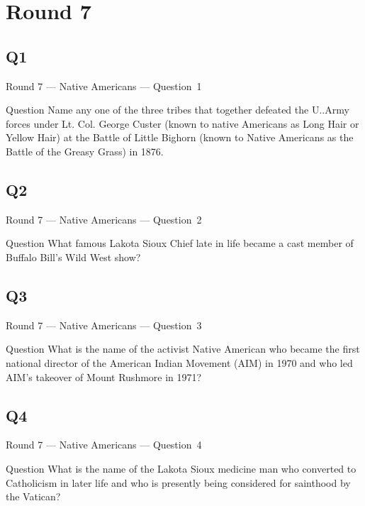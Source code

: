 \documentclass[11pt]{beamer}
\begin{document}
\section{Round 7}
\subsection*{Q1}
\begin{frame}[t]{Round 7 --- Native Americans --- \mbox{Question 1}}
    \vspace{-0.5em}
    \begin{block}{Question}
        Name any one of the three tribes that together defeated the U.\@S.\@ Army forces under Lt. Col. George Custer (known to native Americans as Long Hair or Yellow Hair) at the Battle of Little Bighorn (known to Native Americans as the Battle of the Greasy Grass) in 1876.
    \end{block}
\end{frame}
\subsection*{Q2}
\begin{frame}[t]{Round 7 --- Native Americans --- \mbox{Question 2}}
    \vspace{-0.5em}
    \begin{block}{Question}
        What famous Lakota Sioux Chief late in life became a cast member of Buffalo Bill's Wild West show?
    \end{block}
\end{frame}
\subsection*{Q3}
\begin{frame}[t]{Round 7 --- Native Americans --- \mbox{Question 3}}
    \vspace{-0.5em}
    \begin{block}{Question}
        What is the name of the activist Native American who became the first national director of the American Indian Movement (AIM) in 1970 and who led AIM's takeover of Mount Rushmore in 1971?
    \end{block}
\end{frame}
\subsection*{Q4}
\begin{frame}[t]{Round 7 --- Native Americans --- \mbox{Question 4}}
    \vspace{-0.5em}
    \begin{block}{Question}
        What is the name of the Lakota Sioux medicine man who converted to Catholicism in later life and who is presently being considered for sainthood by the Vatican?
    \end{block}
\end{frame}
\end{document}
